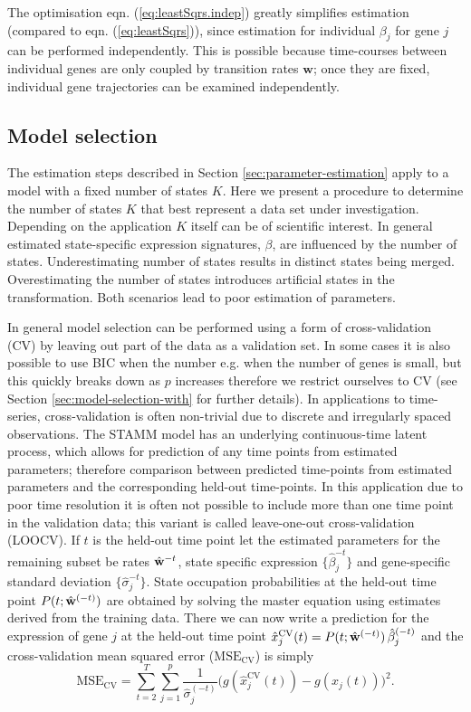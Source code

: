 The optimisation eqn. (\ref{eq:leastSqrs.indep}) greatly simplifies estimation (compared to  eqn. (\ref{eq:leastSqrs})), since estimation for individual $\beta_j$ for gene $j$ can be performed independently. This is possible because time-courses between individual genes are only coupled by transition rates $\mathbf{w}$; once they are fixed, individual gene trajectories can be examined independently. 

\subsection{Model selection}
\label{sec:model-selection}

The estimation steps described in Section \ref{sec:parameter-estimation} apply to a model with a fixed number of states $K$. Here we present a procedure to determine the number of states $K$ that best represent a data set under investigation. Depending on the application $K$ itself can be of scientific interest. In general estimated state-specific expression signatures, $\beta$, are influenced by the number of states. Underestimating number of states results in distinct states being merged. Overestimating the number of states introduces artificial states in the transformation. Both scenarios lead to poor estimation of parameters. 

In general model selection can be performed using a form of cross-validation (CV) by leaving out part of the data as a validation set. In some cases it is also possible to use BIC when the number e.g. when the number of genes is small, but this quickly breaks down as $p$ increases therefore we restrict ourselves to CV (see Section \ref{sec:model-selection-with} for further details). In applications to time-series, cross-validation is often non-trivial due to discrete and irregularly spaced observations. The STAMM model has an underlying continuous-time latent process, which allows for prediction of any time points from estimated parameters; therefore comparison between predicted time-points from estimated parameters and the corresponding held-out time-points. In this application due to poor time resolution it is often not possible to include more than one time point in the validation data; this variant is called leave-one-out cross-validation (LOOCV). If $t$ is the held-out time point let the estimated parameters for the remaining subset be rates $\hat{\bf{w}}^{-t}$, state specific expression $\lbrace \hat{\beta}_j^{-t} \rbrace$ and gene-specific standard deviation $\lbrace \hat{\sigma}_j^{-t} \rbrace$. State occupation probabilities at the held-out time point  $P(t; \hat{\bf{w}}^{(-t)})$ are obtained by solving the master equation using estimates derived from the training data. There we can now write a prediction for the expression of gene $j$ at the held-out time point $\hat{x}^{\mathrm{CV}}_j(t) = P(t; \hat{\bf{w}}^{(-t)})\, \hat{\beta}_j^{(-t)}$ and the cross-validation 
mean squared error ($\mathrm{MSE_{CV}}$) is simply
\begin{equation}
  \mathrm{MSE_{CV}}  =  \sum_{t=2}^T \sum_{j=1}^p \frac{1}{\hat{\sigma}_j^{(-t)}}\bigl( g(\hat{x}^{\mathrm{CV}}_j(t)) - g(x_j(t)) \bigr)^2.
  \label{eq:mse-cv}
\end{equation}

